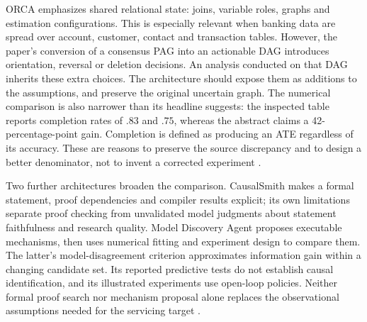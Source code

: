 ORCA emphasizes shared relational state: joins, variable roles, graphs and
estimation configurations. This is especially relevant when banking data are
spread over account, customer, contact and transaction tables. However, the
paper's conversion of a consensus PAG into an actionable DAG introduces
orientation, reversal or deletion decisions. An analysis conducted on that DAG
inherits these extra choices. The architecture should expose them as additions
to the assumptions, and preserve the original uncertain graph. The numerical
comparison is also narrower than its headline suggests: the inspected table
reports completion rates of $.83$ and $.75$, whereas the abstract claims a
42-percentage-point gain. Completion is defined as producing an ATE regardless
of its accuracy. These are reasons to preserve the source discrepancy and to
design a better denominator, not to invent a corrected experiment
\cite{exec13_census_orca}.

Two further architectures broaden the comparison. CausalSmith makes a formal
statement, proof dependencies and compiler results explicit; its own limitations
separate proof checking from unvalidated model judgments about statement
faithfulness and research quality. Model Discovery Agent proposes executable
mechanisms, then uses numerical fitting and experiment design to compare them.
The latter's model-disagreement criterion approximates information gain within
a changing candidate set. Its reported predictive tests do not establish
causal identification, and its illustrated experiments use open-loop policies.
Neither formal proof search nor mechanism proposal alone replaces the
observational assumptions needed for the servicing target
\cite{exec13_census_causalsmith,v12_la_2608_09696}.

